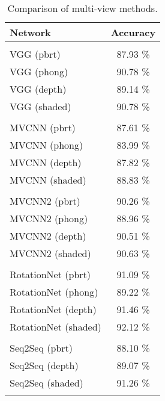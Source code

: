 \begin{table}[]
	\centering
	\begin{tabular}{lc}
		\hline
		\textbf{Network}     & Accuracy \\ \hline
		                     &          \\
		VGG (pbrt)           & 87.93 \% \\
		VGG (phong)         & 90.78 \% \\
		VGG (depth)          & 89.14 \% \\
		VGG (shaded)         & 90.78 \% \\
		                     &          \\
		MVCNN (pbrt)         & 87.61 \% \\
		MVCNN (phong)        & 83.99 \% \\
		MVCNN (depth)        & 87.82 \% \\
		MVCNN (shaded)       & 88.83 \% \\
		                     &          \\
		MVCNN2 (pbrt)        & 90.26 \% \\
		MVCNN2 (phong)       & 88.96 \% \\
		MVCNN2 (depth)       & 90.51 \% \\
		MVCNN2 (shaded)      & 90.63 \% \\
		                     &          \\
		RotationNet (pbrt)   & 91.09 \% \\
		RotationNet (phong)  & 89.22 \% \\
		RotationNet (depth)  & 91.46 \% \\
		RotationNet (shaded) & 92.12 \% \\
		                     &          \\
		Seq2Seq  (pbrt)      & 88.10 \% \\
		Seq2Seq  (depth)     & 89.07 \% \\
		Seq2Seq  (shaded)    & 91.26 \% \\
		                     &          \\ \hline
	\end{tabular}
\caption{Comparison of multi-view methods.}
\label{Table:mv}
\end{table}